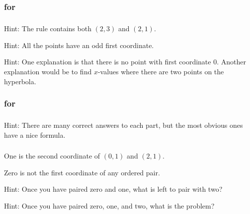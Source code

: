 \subsection{\answers}

\subsubsection{\answers for  \suborderedpair}

\subsubsection*{ \answers}
\begin{apart}
    \item Hint: The rule contains both $(2,3)$ and $(2,1)$.
    \item Hint: All the points have an odd first coordinate.
    \item Hint:  One explanation is that there is no point with first coordinate 0. Another explanation would be to find $x$-values where there are two points on the hyperbola. 
\end{apart}

\subsubsection{\answers for  \subpairing}

\subsubsection*{ \answers}
Hint: There are many correct answers to each part, but the most obvious ones have a nice formula.

\subsubsection*{ \answers}
\begin{apart}
    \item One is the second coordinate of $(0,1)$ and $(2,1)$.
    \item Zero is not the first coordinate of any ordered pair.
    \item  Hint: Once you have paired zero and one, what is left to pair with two?
    \item Hint: Once you have paired zero, one, and two, what is the problem?
\end{apart}


